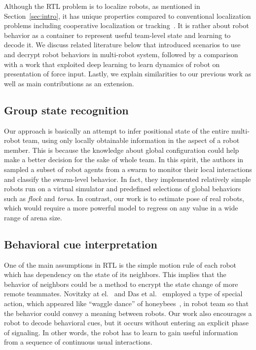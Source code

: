 \documentclass[letterpaper, 10 pt, conference]{ieeeconf}  %
\begin{document}
	Although the RTL problem is to localize robots, as mentioned in
	Section~\ref{sec:intro}, it has unique properties compared to conventional
    localization problems including	cooperative localization or
    tracking~\cite{LSRB16, FSDO10, CX14, DMG15}.
	It is rather about robot behavior as a container to
	represent useful team-level state and learning to decode it.
	We discuss related literature below that introduced scenarios to use and decrypt
	robot behaviors in multi-robot system, followed by a comparison with a work
	that exploited deep learning to learn dynamics of robot on presentation
	of force input.
	Lastly, we explain similarities to our previous work as well as main
	contributions as an extension.

	\subsection{Group state recognition}
	\label{sec:group_state_recognition}
	Our approach is basically an attempt to infer positional state of the entire
	multi-robot team, using only locally obtainable information in the aspect of a robot
	member. This is because the knowledge about global configuration could
	help make a better decision for the sake of whole team. In this spirit,
	the authors in~\cite{BG14, BSB16} sampled a subset of robot agents from a swarm to
	monitor their local interactions and classify the swarm-level behavior.
	In fact, they implemented relatively simple robots run on a virtual simulator and
	predefined selections of global behaviors such as \emph{flock} and \emph{torus}.
	In contrast, our work is to estimate pose of real robots, which would require a more
	powerful model to regress on any value in a wide range of arena size.

	\subsection{Behavioral cue interpretation}
	\label{sec:behavioral_cue_interpretation}

	One of the main assumptions in RTL is the simple motion rule of each robot which
	has dependency on the state of its neighbors. This implies that the behavior of
	neighbors could be a method to encrypt the state change of more remote teammates.
    Novitzky at el.~\cite{NPCBW12} and Das et al.~\cite{DCV16} employed a type of
    special action, which appeared like ``waggle dance'' of honeybees~\cite{VonFrisch67},
	in robot team so that the behavior could convey a meaning between robots.
	Our work also encourages a robot to decode behavioral cues, but it occurs without
	entering an explicit phase of signaling. In other words, the robot has to learn
	to gain useful information from a sequence of continuous usual interactions.
\end{document}

